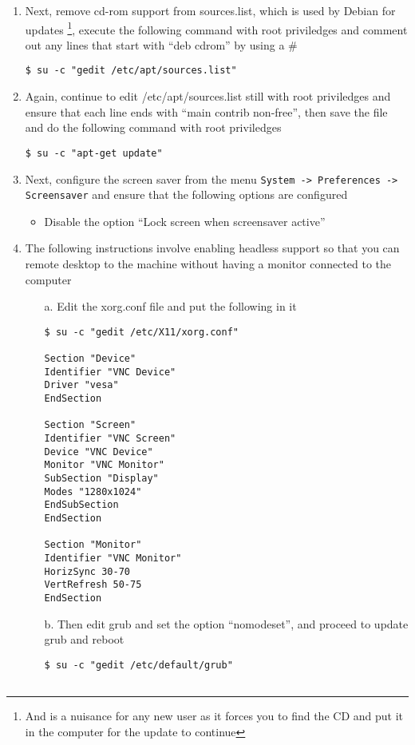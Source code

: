 \begin{enumerate}
\item Next, remove cd-rom support from sources.list, which is used by Debian for updates \footnote{And is a nuisance for any new user
as it forces you to find the CD and put it in the computer for the update to continue}, execute the following command with root priviledges
and comment out any lines that start with ``deb cdrom'' by using a \#
\lstset{caption=Removing CD-ROM Requirement for Updates}
\begin{lstlisting}
$ su -c "gedit /etc/apt/sources.list"
\end{lstlisting}

\item Again, continue to edit /etc/apt/sources.list still with root priviledges and ensure that each line ends with ``main contrib non-free'',
then save the file and do the following command with root priviledges
\lstset{caption=Updating the System}
\begin{lstlisting}
$ su -c "apt-get update"
\end{lstlisting}

\item Next, configure the screen saver from the menu \verb|System -> Preferences -> Screensaver| and ensure that the following options are 
configured
\begin{itemize}
\item	Disable the option ``Lock screen when screensaver active''
\end{itemize}

\item The following instructions involve enabling headless support so that you can remote desktop to the machine without having a monitor
connected to the computer
\begin{itemize}
\item[a.] Edit the xorg.conf file and put the following in it
\lstset{caption=Configuring Xorg for Headless Support}
\begin{lstlisting}
$ su -c "gedit /etc/X11/xorg.conf"

Section "Device"
Identifier "VNC Device"
Driver "vesa"
EndSection

Section "Screen"
Identifier "VNC Screen"
Device "VNC Device"
Monitor "VNC Monitor"
SubSection "Display"
Modes "1280x1024"
EndSubSection
EndSection

Section "Monitor"
Identifier "VNC Monitor"
HorizSync 30-70
VertRefresh 50-75
EndSection
\end{lstlisting}
	
\item[b.] Then edit grub and set the option ``nomodeset'', and proceed to update grub and reboot
\lstset{caption=Configuring Grub for Headless Support}
\begin{lstlisting}
$ su -c "gedit /etc/default/grub"


\end{lstlisting}
\end{itemize}
\end{enumerate}
